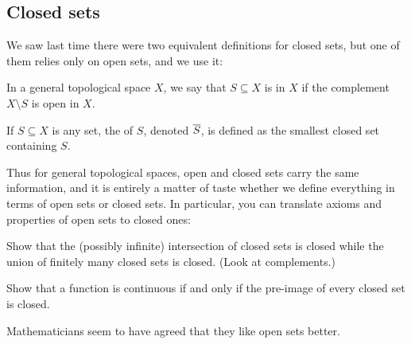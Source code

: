 
\subsection{Closed sets}
We saw last time there were two equivalent definitions
for closed sets, but one of them relies only on open sets, and we use it:
\begin{definition}
	In a general topological space $X$, we say that $S \subseteq X$ is
	 in $X$ if the complement $X \setminus S$ is open in $X$.

	If $S \subseteq X$ is any set, the  of $S$,
	denoted $\overline S$, is defined as the smallest closed set containing $S$.
\end{definition}
Thus for general topological spaces,
open and closed sets carry the same information,
and it is entirely a matter of taste whether we define everything in terms
of open sets or closed sets.
In particular, you can translate axioms and properties of open sets to closed ones:
\begin{ques}
	Show that the (possibly infinite) intersection of closed sets is closed
	while the union of finitely many closed sets is closed.
	(Look at complements.)
\end{ques}
\begin{exercise}
	Show that a function is continuous if and only if the pre-image
	of every closed set is closed.
\end{exercise}
Mathematicians seem to have agreed that they like open sets better.


